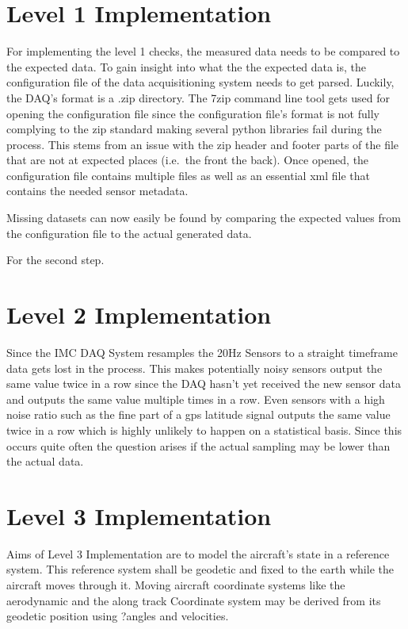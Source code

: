 \section{Level 1 Implementation}

For implementing the level 1 checks, the measured data needs to be compared to the expected data. To gain insight into what the the expected data is, the configuration file of the data acquisitioning system needs to get parsed.
Luckily, the DAQ's format is a .zip directory.
The 7zip command line tool gets used for opening the configuration file since the configuration file's format is not fully complying to the zip standard making several python libraries fail during the process. This stems from an issue with the zip header and footer parts of the file that are not at expected places (i.e.\ the front the back).
Once opened, the configuration file contains multiple files as well as an essential xml file that contains the needed sensor metadata.

Missing datasets can now easily be found by comparing the expected values from the configuration file to the actual generated data.

For the second step.


\section{Level 2 Implementation}

Since the IMC DAQ System resamples the 20Hz Sensors to a straight timeframe data gets lost in the process. This makes potentially noisy sensors output the same value twice in a row since the DAQ hasn't yet received the new sensor data and outputs the same value multiple times in a row. Even sensors with a high noise ratio such as the fine part of a gps latitude signal outputs the same value twice in a row which is highly unlikely to happen on a statistical basis. Since this occurs quite often the question arises if the actual sampling may be lower than the actual data.


\section{Level 3 Implementation}

Aims of Level 3 Implementation are to model the aircraft's state in a reference system.
This reference system shall be geodetic and fixed to the earth while the aircraft moves through it. Moving aircraft coordinate systems like the aerodynamic and the along track Coordinate system may be derived from its geodetic position using ?angles and velocities.


